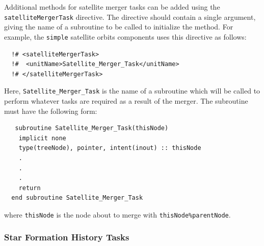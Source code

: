 Additional methods for satellite merger tasks can be added using the {\tt satelliteMergerTask} directive. The directive should contain a single argument, giving the name of a subroutine to be called to initialize the method. For example, the {\tt simple} satellite orbits components uses this directive as follows:
\begin{verbatim}
  !# <satelliteMergerTask>
  !#  <unitName>Satellite_Merger_Task</unitName>
  !# </satelliteMergerTask>
\end{verbatim}
Here, {\tt Satellite\_Merger\_Task} is the name of a subroutine which will be called to perform whatever tasks are required as a result of the merger. The subroutine must have the following form:
\begin{verbatim}
   subroutine Satellite_Merger_Task(thisNode)
    implicit none
    type(treeNode), pointer, intent(inout) :: thisNode
    .
    .
    .
    return
  end subroutine Satellite_Merger_Task
\end{verbatim}
where {\tt thisNode} is the node about to merge with {\tt thisNode\%parentNode}.

\subsubsection{Star Formation History Tasks}\label{sec:StarFormationHistoryTasks}

